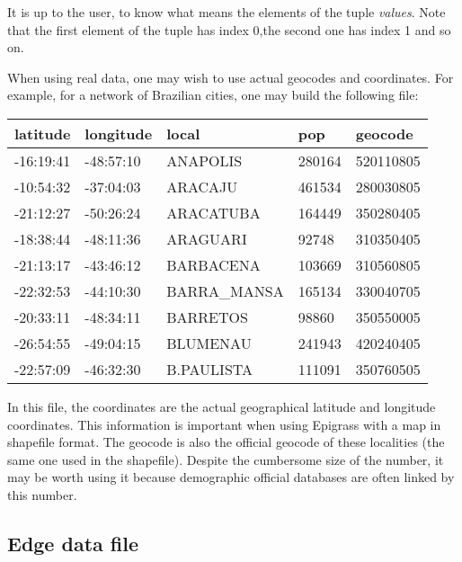 \documentclass[a4paper,10pt]{manual}
\begin{document}
It is up to the user, to know what means the elements of the tuple \emph{values}. Note that the first element of the tuple has index 0,the second one has index 1 and so on.

When using real data, one may wish to use actual geocodes and coordinates. For example, for a network of Brazilian cities, one may build the following file:

\begin{tabulary}{\textwidth}{|L|L|L|L|L|}
\hline
\textbf{
latitude
} & \textbf{
longitude
} & \textbf{
local
} & \textbf{
pop
} & \textbf{
geocode
}\\
\hline

-16:19:41
 & 
-48:57:10
 & 
ANAPOLIS
 & 
280164
 & 
520110805
\\

-10:54:32
 & 
-37:04:03
 & 
ARACAJU
 & 
461534
 & 
280030805
\\

-21:12:27
 & 
-50:26:24
 & 
ARACATUBA
 & 
164449
 & 
350280405
\\

-18:38:44
 & 
-48:11:36
 & 
ARAGUARI
 & 
92748
 & 
310350405
\\

-21:13:17
 & 
-43:46:12
 & 
BARBACENA
 & 
103669
 & 
310560805
\\

-22:32:53
 & 
-44:10:30
 & 
BARRA\_MANSA
 & 
165134
 & 
330040705
\\

-20:33:11
 & 
-48:34:11
 & 
BARRETOS
 & 
98860
 & 
350550005
\\

-26:54:55
 & 
-49:04:15
 & 
BLUMENAU
 & 
241943
 & 
420240405
\\

-22:57:09
 & 
-46:32:30
 & 
B.PAULISTA
 & 
111091
 & 
350760505
\\
\hline
\end{tabulary}


In this file, the coordinates are the actual geographical latitude and longitude coordinates. This information is important when using Epigrass with a map in shapefile format. The geocode is also the official geocode of these localities (the same one used in the shapefile). Despite the cumbersome size of the number, it may be worth using it because demographic official databases are often linked by this number.


\subsection{Edge data file}
\end{document}
